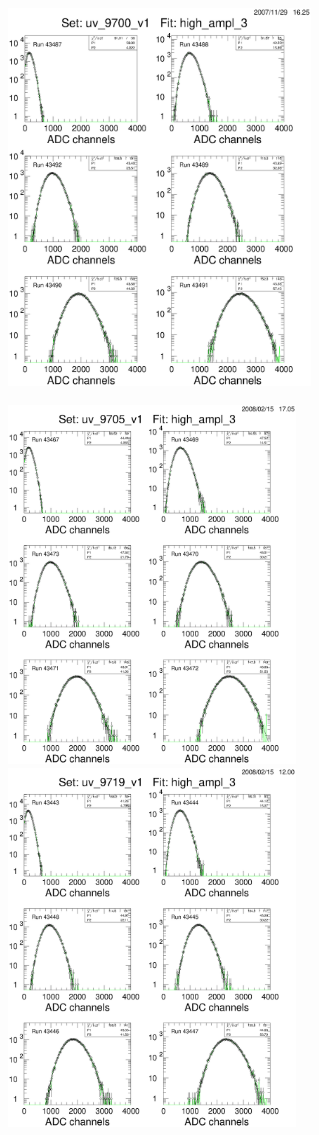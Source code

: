 \begin{figure}
\vspace{0.5cm}
\begin{centering}
\includegraphics[height=10.0cm]{PMT-studies/uv_9700_v1_fits.eps}
\end{centering}
\begin{centering}
\includegraphics[height=9.5cm]{PMT-studies/uv_9705_v1_fits.eps}
\includegraphics[height=9.5cm]{PMT-studies/uv_9719_v1_fits.eps}

\end{centering}
\end{figure}
